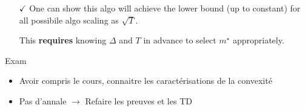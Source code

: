 \begin{itemize}
    \item [$ \checkmark  $ ] One can show this algo will achieve the lower bound (up to constant) for all possibile algo scaling as $ \sqrt{T} $.
    \item [\texttimes] This \textbf{requires} knowing $ \Delta  $ and $ T $ in advance to select $ m^\star  $ appropriately.
\end{itemize}

Exam
\begin{itemize}
    \item Avoir compris le cours, connaitre les caractérisations de la convexité
    \item Pas d'annale $\rightarrow$ Refaire les preuves et les TD 
\end{itemize}
